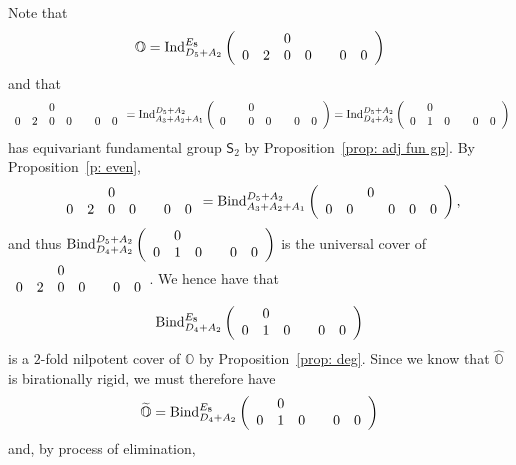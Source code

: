 \documentclass[11pt]{amsart}
\renewcommand{\O}{{\mathbb O}}
\newcommand{\Sym}{{\mathsf{S}}}
\newcommand{\Ind}{{{\mbox{\rm Ind}}}}
\newcommand{\BInd}{{{\mbox{\rm Bind}}}}
\newcommand{\covO}{\widetilde{\O}}
\newcommand{\hatO}{\widehat{\O}}
\numberwithin{equation}{section}
\begin{document}
	Note that $$\O=\Ind_{D_5 + A_2}^{E_8}\left( \begin{array}{c c c c c c c}
		&  & 0 & & & & \\
		0 & 2 & 0 & 0 &  & 0 & 0  \\
	\end{array}   \right)$$ and that $$\begin{array}{c c c c c c c}
		&  & 0 & & & & \\
		0 & 2 & 0  & 0 &  & 0 & 0  \\
	\end{array}=\Ind_{A_3 + A_2 + A_1}^{D_5+A_2}\left(\begin{array}{c c c c c c c}
		& & 0 & & & & \\
		0 & & 0 & 0 & & 0 & 0  \\
	\end{array}\right)=\Ind_{D_4 + A_2}^{D_5+A_2}\left(\begin{array}{c c c c c c}
		& 0 &  & & &  \\
		0 & 1 & 0 & & 0 & 0  \\
	\end{array}\right)$$
	has equivariant fundamental group $\Sym_2$ by Proposition~\ref{prop: adj fun gp}. By Proposition~\ref{p: even}, $$\begin{array}{c c c c c c c}
		&  & 0 & & & & \\
		0 & 2 & 0 & 0 &  & 0 & 0  \\
	\end{array}=\BInd_{A_3 + A_2 + A_1}^{D_5+A_2}\left(\begin{array}{c c c c c c}
		& & 0 & & &  \\
		0 & 0 &  & 0 & 0 & 0  \\
	\end{array}\right),$$ and thus 
	$\BInd_{D_4 + A_2}^{D_5+A_2}\left(\begin{array}{c c c c c c}
		& 0 &  & & &  \\
		0 & 1 & 0 & & 0 & 0  \\
	\end{array}\right)$ is the universal cover of $\begin{array}{c c c c c c c}
		&  & 0 & & & & \\
		0 & 2 & 0 & 0 &  & 0 & 0  \\
	\end{array}$. We hence have that $$\BInd_{D_4 + A_2}^{E_8}\left(\begin{array}{c c c c c c}
		& 0 &  & & &  \\
		0 & 1 & 0 & & 0 & 0  \\
	\end{array}\right)$$ is a $2$-fold nilpotent cover of $\O$ by Proposition~\ref{prop: deg}. Since we know that $\hatO$ is birationally rigid, we must therefore have $$\covO=\BInd_{D_4 + A_2}^{E_8}\left(\begin{array}{c c c c c c}
		& 0 &  & & &  \\
		0 & 1 & 0 & & 0 & 0  \\
	\end{array}\right)$$ and, by process of elimination,
\end{document}
